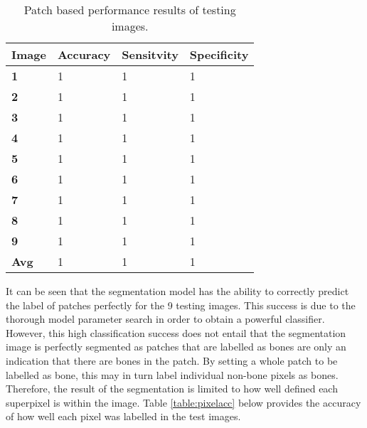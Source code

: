 \begin{table}[H]
\centering
\caption{Patch based performance results of testing images.}

\begin{tabular}{|l|l|l|l|}
\hline
\textbf{Image}	& \textbf{Accuracy} & \textbf{Sensitvity} & \textbf{Specificity}\\
\hline
\textbf{1}		& 1		& 1		& 1\\ 
\hline
\textbf{2} 		& 1		& 1		& 1	\\
\hline
\textbf{3}		& 1		& 1		& 1	\\
\hline
\textbf{4}		& 1		& 1		& 1	\\
\hline
\textbf{5}		& 1		& 1		& 1	\\
\hline
\textbf{6} 		& 1		& 1		& 1	\\
\hline
\textbf{7}		& 1		& 1		& 1	\\
\hline
\textbf{8}		& 1		& 1		& 1\\
\hline
\textbf{9} 		& 1		& 1		& 1\\
\hline				    	 			 
\hline
\textbf{Avg}		&1		& 1		& 1\\ 
\hline		    	 
\end{tabular}
\label{table:patchacc}
\end{table}

It can be seen that the segmentation model has the ability to correctly predict the label of patches perfectly for the 9 testing images. This success is due to the thorough model parameter search in order to obtain a powerful classifier. However, this high classification success does not entail that the segmentation image is perfectly segmented as patches that are labelled as bones are only an indication that there are bones in the patch. By setting a whole patch to be labelled as bone, this may in turn label individual non-bone pixels as bones. Therefore, the result of the segmentation is limited to how well defined each superpixel is within the image. Table \ref{table:pixelacc} below provides the accuracy of how well each pixel was labelled in the test images.

